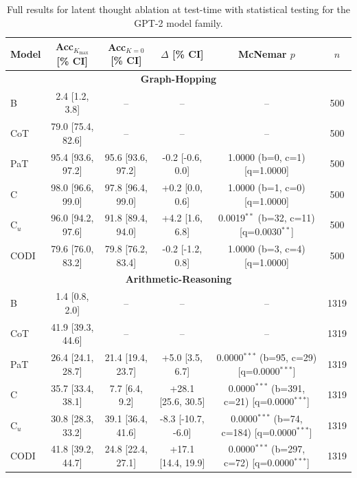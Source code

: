 \begin{table}[h!]
\centering
\small
\setlength{\tabcolsep}{4pt}
\begin{tabular}{l ccc cc}
\toprule
Model & Acc$_{K_{\max}}$ [\% CI] & Acc$_{K{=}0}$ [\% CI] & $\Delta$ [\% CI] & McNemar $p$ & $n$ \\
\midrule
\multicolumn{6}{c}{\textbf{Graph-Hopping}} \\
\midrule
B & 2.4 [1.2, 3.8] & -- & -- & -- & 500 \\
CoT & 79.0 [75.4, 82.6] & -- & -- & -- & 500 \\
PaT & 95.4 [93.6, 97.2] & 95.6 [93.6, 97.2] & -0.2 [-0.6, 0.0] & 1.0000 (b=0, c=1) [q=1.0000] & 500 \\
C & 98.0 [96.6, 99.0] & 97.8 [96.4, 99.0] & +0.2 [0.0, 0.6] & 1.0000 (b=1, c=0) [q=1.0000] & 500 \\
C$_u$ & 96.0 [94.2, 97.6] & 91.8 [89.4, 94.0] & +4.2 [1.6, 6.8] & 0.0019$^{**}$ (b=32, c=11) [q=0.0030$^{**}$] & 500 \\
CODI & 79.6 [76.0, 83.2] & 79.8 [76.2, 83.4] & -0.2 [-1.2, 0.8] & 1.0000 (b=3, c=4) [q=1.0000] & 500 \\
\midrule
\multicolumn{6}{c}{\textbf{Arithmetic-Reasoning}} \\
\midrule
B & 1.4 [0.8, 2.0] & -- & -- & -- & 1319 \\
CoT & 41.9 [39.3, 44.6] & -- & -- & -- & 1319 \\
PaT & 26.4 [24.1, 28.7] & 21.4 [19.4, 23.7] & +5.0 [3.5, 6.7] & 0.0000$^{***}$ (b=95, c=29) [q=0.0000$^{***}$] & 1319 \\
C & 35.7 [33.4, 38.1] & 7.7 [6.4, 9.2] & +28.1 [25.6, 30.5] & 0.0000$^{***}$ (b=391, c=21) [q=0.0000$^{***}$] & 1319 \\
C$_u$ & 30.8 [28.3, 33.2] & 39.1 [36.4, 41.6] & -8.3 [-10.7, -6.0] & 0.0000$^{***}$ (b=74, c=184) [q=0.0000$^{***}$] & 1319 \\
CODI & 41.8 [39.2, 44.7] & 24.8 [22.4, 27.1] & +17.1 [14.4, 19.9] & 0.0000$^{***}$ (b=297, c=72) [q=0.0000$^{***}$] & 1319 \\
\bottomrule
\end{tabular}
\caption{Full results for latent thought ablation at test-time with statistical testing for the GPT-2 model family.}
\label{tab:ablation_stats_gpt2}
\end{table}